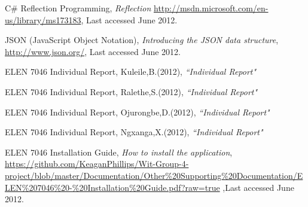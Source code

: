 \documentclass[a4paper,12pt]{Article}
\begin{document}
\begin{thebibliography}{99}
C\# Reflection Programming,
\textit{Reflection} \url{http://msdn.microsoft.com/en-us/library/ms173183},%
Last accessed June 2012.

JSON (JavaScript Object Notation), 
\textit{Introducing the JSON data structure},
\url{http://www.json.org/}, Last accessed June 2012.

 ELEN 7046 Individual Report, 
Kuleile,B.(2012), 
\textit{``Individual Report"}

 ELEN 7046 Individual Report, 
Ralethe,S.(2012), 
\textit{``Individual Report"}

 ELEN 7046 Individual Report, 
Ojurongbe,D.(2012), 
\textit{``Individual Report"}

 ELEN 7046 Individual Report, 
Ngxanga,X.(2012), 
\textit{``Individual Report"}


 ELEN 7046 Installation Guide, \textit{How to install the application},
\url{https://github.com/KeaganPhillips/Wit-Group-4-project/blob/master/Documentation/Other%20Supporting%20Documentation/ELEN%207046%20-%20Installation%20Guide.pdf?raw=true}
,Last accessed June 2012.




\end{thebibliography}
\appendix
\end{document}
